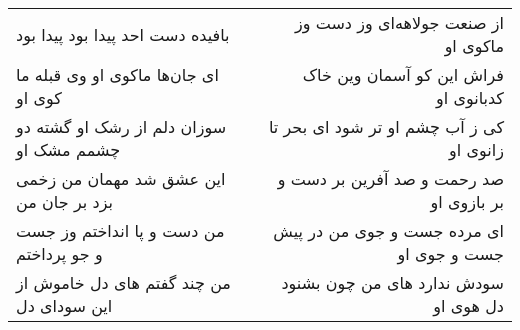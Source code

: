 \begin{center}
\begin{longtable}{l p{0.5cm} r}
\\
بافیده دست احد پیدا بود پیدا بود
&&
از صنعت جولاهه‌ای وز دست وز ماکوی او
\\
ای جان‌ها ماکوی او وی قبله ما کوی او
&&
فراش این کو آسمان وین خاک کدبانوی او
\\
سوزان دلم از رشک او گشته دو چشمم مشک او
&&
کی ز آب چشم او تر شود ای بحر تا زانوی او
\\
این عشق شد مهمان من زخمی بزد بر جان من
&&
صد رحمت و صد آفرین بر دست و بر بازوی او
\\
من دست و پا انداختم وز جست و جو پرداختم
&&
ای مرده جست و جوی من در پیش جست و جوی او
\\
من چند گفتم های دل خاموش از این سودای دل
&&
سودش ندارد های من چون بشنود دل هوی او
\\
\end{longtable}
\end{center}
